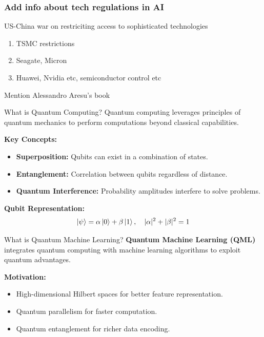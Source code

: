 \documentclass{beamer}
\begin{document}
\begin{frame}
\frametitle{Add info about tech regulations in AI}
US-China war on restriciting access to sophisticated technologies
\begin{enumerate}
\item TSMC restrictions
\item Seagate, Micron
\item Huawei, Nvidia etc, semiconductor control etc
\end{enumerate}
Mention Alessandro Aresu's book
\end{frame}




\begin{frame}{What is Quantum Computing?}
Quantum computing leverages principles of quantum mechanics to perform computations beyond classical capabilities.

\vspace{10pt}
\textbf{Key Concepts:}
\begin{itemize}
\item \textbf{Superposition:} Qubits can exist in a combination of states.
\item \textbf{Entanglement:} Correlation between qubits regardless of distance.
\item \textbf{Quantum Interference:} Probability amplitudes interfere to solve problems.
\end{itemize}

\textbf{Qubit Representation:}
\[
\ket{\psi} = \alpha \ket{0} + \beta \ket{1}, \quad |\alpha|^2 + |\beta|^2 = 1
\]
\end{frame}


\begin{frame}{What is Quantum Machine Learning?}
\textbf{Quantum Machine Learning (QML)} integrates quantum computing with machine learning algorithms to exploit quantum advantages.

\vspace{10pt}
\textbf{Motivation:}
\begin{itemize}
    \item High-dimensional Hilbert spaces for better feature representation.
    \item Quantum parallelism for faster computation.
    \item Quantum entanglement for richer data encoding.
\end{itemize}


\end{frame}
\end{document}
